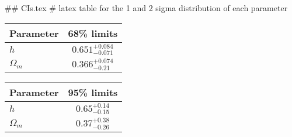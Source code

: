 ## CIs.tex
# latex table for the 1 and 2 sigma distribution of each parameter

\begin{tabular} { l  c}
 Parameter &  68\% limits\\
\hline
{\boldmath$h              $} & $0.651^{+0.084}_{-0.071}   $\\
{\boldmath$\Omega_m       $} & $0.366^{+0.074}_{-0.21}    $\\
\hline
\end{tabular}

\begin{tabular} { l  c}
 Parameter &  95\% limits\\
\hline
{\boldmath$h              $} & $0.65^{+0.14}_{-0.15}      $\\
{\boldmath$\Omega_m       $} & $0.37^{+0.38}_{-0.26}      $\\
\hline
\end{tabular}
